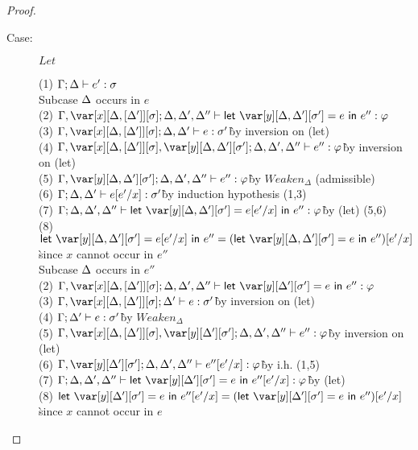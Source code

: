 \begin{proof}
\begin{description}
\item[Case:] $Let$
\begin{tabbing}
    (1) $\Gamma; \Delta \vdash e' : \sigma$\\
    Subcase $\Delta$ occurs in $e$\\
    (2) $\G, \xD; \D, \D', \D'' \vdash \llet{\y[\D,\D'][\s'] = e}{e''} : \vp$\\
    (3) $\G, \xD; \D, \D' \vdash e : \s'$\` by inversion on (let)\\
    (4) $\G, \xD,\y[\D,\D'][\s']; \D,\D', \D'' \vdash e'' : \vp$\` by inversion on (let)\\
    (5) $\G,\y[\D,\D'][\s']; \D,\D', \D'' \vdash e'' : \vp$\` by $Weaken_\Delta$ (admissible)\\
    (6) $\Gamma; \Delta,\Delta' \vdash e[e'/x] : \sigma'$\` by induction hypothesis (1,3)\\
    (7) $\G; \D,\D',\D'' \vdash \llet{\y[\D,\D'][\s'] = e[e'/x]}{e''} : \vp$\` by (let) (5,6)\\
    (8) $\llet{\y[\D,\D'][\s'] = e[e'/x]}{e''} = (\llet{\y[\D,\D'][\s'] = e}{e''})[e'/x]$\\\` since $x$ cannot occur in $e''$\\
    Subcase $\Delta$ occurs in $e''$\\
    (2) $\G, \xD; \D, \D', \D'' \vdash \llet{\y[\D'][\s'] = e}{e''} : \vp$\\
    (3) $\G, \xD; \D' \vdash e : \s'$\` by inversion on (let)\\
    (4) $\Gamma; \Delta' \vdash e : \sigma'$\` by $Weaken_\Delta$\\
    (5) $\G,\xD,\y[\D'][\s']; \D,\D',\D'' \vdash e'' : \vp$\` by inversion on (let)\\
    (6) $\G,\y[\D'][\s']; \D,\D',\D'' \vdash e''[e'/x] : \vp$\` by i.h. (1,5)\\
    (7) $\G;\D,\D',\D'' \vdash \llet{\y[\D'][\s'] = e}{e''[e'/x]} : \vp$\` by (let)\\
    (8) $\llet{\y[\D'][\s'] = e}{e''[e'/x]} = (\llet{\y[\D'][\s'] = e}{e''})[e'/x]$\\\` since $x$ cannot occur in $e$\\
\end{tabbing}


\end{description}
\end{proof}

